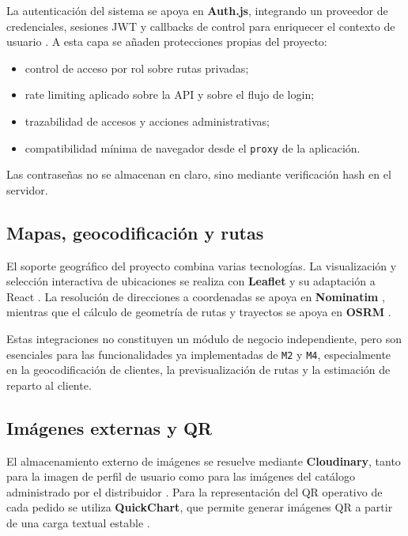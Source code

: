 La autenticación del sistema se apoya en \textbf{Auth.js}, integrando un proveedor de credenciales, sesiones JWT y callbacks de control para enriquecer el contexto de usuario \citep{authjsdocs2026}. A esta capa se añaden protecciones propias del proyecto:

\begin{itemize}
    \item control de acceso por rol sobre rutas privadas;
    \item rate limiting aplicado sobre la API y sobre el flujo de login;
    \item trazabilidad de accesos y acciones administrativas;
    \item compatibilidad mínima de navegador desde el \texttt{proxy} de la aplicación.
\end{itemize}

Las contraseñas no se almacenan en claro, sino mediante verificación hash en el servidor.

\subsection{Mapas, geocodificación y rutas}

El soporte geográfico del proyecto combina varias tecnologías. La visualización y selección interactiva de ubicaciones se realiza con \textbf{Leaflet} y su adaptación a React \citep{leafletdocs2026}. La resolución de direcciones a coordenadas se apoya en \textbf{Nominatim} \citep{nominatimapi2026}, mientras que el cálculo de geometría de rutas y trayectos se apoya en \textbf{OSRM} \citep{osrmdocs2026}.

Estas integraciones no constituyen un módulo de negocio independiente, pero son esenciales para las funcionalidades ya implementadas de \texttt{M2} y \texttt{M4}, especialmente en la geocodificación de clientes, la previsualización de rutas y la estimación de reparto al cliente.

\subsection{Imágenes externas y QR}

El almacenamiento externo de imágenes se resuelve mediante \textbf{Cloudinary}, tanto para la imagen de perfil de usuario como para las imágenes del catálogo administrado por el distribuidor \citep{cloudinaryupload2026}. Para la representación del QR operativo de cada pedido se utiliza \textbf{QuickChart}, que permite generar imágenes QR a partir de una carga textual estable \citep{quickchartqr2026}.

